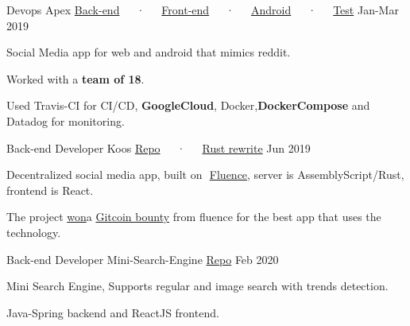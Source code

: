 

\begin{cventries}

  \cventry
    {Devops} %
    {Apex \tiny{\href{https://www.github.com/DarkGeekMS/ApeX-Server}{Back-end}~~~·~~~\href{http://www.github.com/DarkGeekMS/ApeX-Web}{Front-end}~~~·~~~\href{http://www.github.com/DarkGeekMS/ApeX-Mobile}{Android}~~~·~~~\href{https://www.github.com/DarkGeekMS/apeXTesting}{Test}}} %
    {} %
    {Jan-Mar 2019} %
    {
      \begin{cvitems} %
        \item {Social Media app for web and android that mimics reddit.}
        \item {Worked with a \textbf{team of 18}.}
        \item {Used ​Travis-CI ​for CI/CD, \textbf{​GoogleCloud​}, Docker, \textbf{​DockerCompose​} and Datadog for monitoring.}
      \end{cvitems}
    }

  \cventry
    {Back-end Developer} %
    {Koos \tiny{\href{https://gitlab.com/koos-project/koos}{Repo}~~~·~~~\href{https://gitlab.com/koos-project/koos/tree/rust-migration/server}{Rust rewrite}}} %
    {} %
    {Jun 2019} %
    {
      \begin{cvitems} %
        \item {Decentralized social media app, built on ​ \href{http://fluence.dev/}{Fluence​}, server is AssemblyScript/Rust, frontend is React.}
        \item {The project \href{https://www.linkedin.com/feed/update/urn:li:activity:6575339127934341120/}{​won​} a ​\href{https://gitcoin.co/issue/fluencelabs/Bounties/1/3290}{Gitcoin bounty​} from fluence for the best app that uses the technology.}
      \end{cvitems}
    }

  \cventry
    {Back-end Developer} %
    {Mini-Search-Engine \tiny{\href{https://github.com/mido3ds/mini-search-engine/}{Repo}}} %
    {} %
    {Feb 2020} %
    {
      \begin{cvitems} %
        \item {Mini Search Engine, Supports regular and image search with trends detection.}
        \item {Java-Spring backend and ReactJS frontend.}
      \end{cvitems}
    }


\end{cventries}
